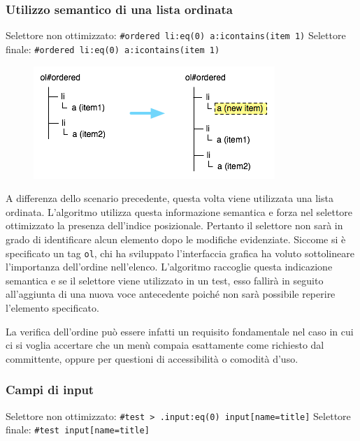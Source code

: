 \subsubsection {Utilizzo semantico di una lista ordinata}

Selettore non ottimizzato:  \verb|#ordered li:eq(0) a:icontains(item 1)| 
\newline
Selettore finale:  \verb|#ordered li:eq(0) a:icontains(item 1)| 

\begin{figure}[htbp]
\begin{center}
\includegraphics{images/dom_examples/ordered_menu.png}
\end{center}
\end{figure}

A differenza dello scenario precedente, questa volta viene utilizzata una lista ordinata. L'algoritmo utilizza questa informazione semantica e forza nel selettore ottimizzato la presenza dell'indice posizionale. Pertanto il selettore non sarà in grado di identificare alcun elemento dopo le modifiche evidenziate. Siccome si è specificato un tag \verb|ol|, chi ha sviluppato l'interfaccia grafica ha voluto sottolineare l'importanza dell'ordine nell'elenco. L'algoritmo raccoglie questa indicazione semantica e se il selettore viene utilizzato in un test, esso fallirà in seguito all'aggiunta di una nuova voce antecedente poiché non sarà possibile reperire l'elemento specificato.

La verifica dell'ordine può essere infatti un requisito fondamentale nel caso in cui ci si voglia accertare che un menù compaia esattamente come richiesto dal committente, oppure per questioni di accessibilità o comodità d'uso.

\subsubsection {Campi di input}

Selettore non ottimizzato:  \verb|#test > .input:eq(0) input[name=title]| 
\newline
Selettore finale:  \verb|#test input[name=title]| 

